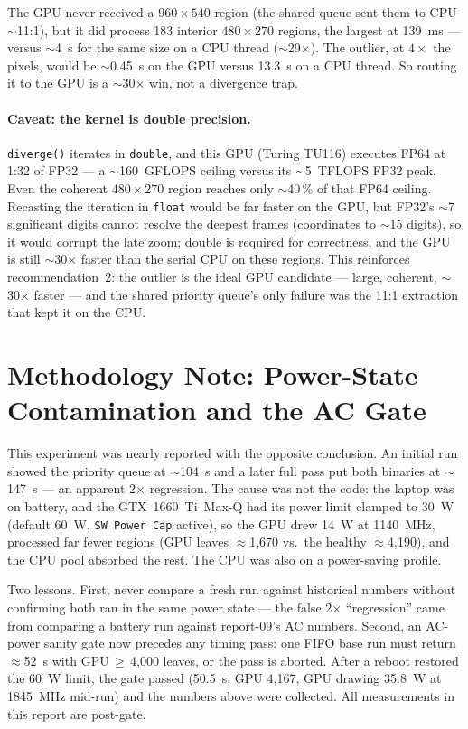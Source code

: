 \documentclass[
	english,
	letterpaper, oneside
]{article}
\begin{document}
The GPU never received a $960\times540$ region (the shared queue sent them to CPU
$\sim$11:1), but it did process 183 interior $480\times270$ regions, the largest
at 139~ms --- versus $\sim$4~s for the same size on a CPU thread ($\sim$29$\times$).
The outlier, at $4\times$ the pixels, would be $\sim$0.45~s on the GPU versus
13.3~s on a CPU thread. So routing it to the GPU is a $\sim$30$\times$ win, not a
divergence trap.

\paragraph{Caveat: the kernel is double precision.} \texttt{diverge()} iterates
in \texttt{double}, and this GPU (Turing TU116) executes FP64 at 1:32 of FP32 ---
a $\sim$160~GFLOPS ceiling versus its $\sim$5~TFLOPS FP32 peak. Even the coherent
$480\times270$ region reaches only $\sim$40\,\% of that FP64 ceiling. Recasting the
iteration in \texttt{float} would be far faster on the GPU, but FP32's $\sim$7
significant digits cannot resolve the deepest frames (coordinates to $\sim$15
digits), so it would corrupt the late zoom; double is required for correctness,
and the GPU is still $\sim$30$\times$ faster than the serial CPU on these regions.
This reinforces recommendation~2: the outlier is the ideal GPU candidate ---
large, coherent, $\sim$30$\times$ faster --- and the shared priority queue's only
failure was the 11:1 extraction that kept it on the CPU.

\section{Methodology Note: Power-State Contamination and the AC Gate}

This experiment was nearly reported with the opposite conclusion. An initial run
showed the priority queue at $\sim$104~s and a later full pass put both
binaries at $\sim$147~s --- an apparent 2$\times$ regression. The cause was not
the code: the laptop was on battery, and the GTX~1660~Ti~Max-Q had its
power limit clamped to 30~W (default 60~W, \texttt{SW Power Cap}
active), so the GPU drew 14~W at 1140~MHz, processed far fewer regions
(GPU leaves $\approx$1{,}670 vs.\ the healthy $\approx$4{,}190), and the CPU pool
absorbed the rest. The CPU was also on a power-saving profile.

Two lessons. First, never compare a fresh run against historical
numbers without confirming both ran in the same power state --- the false
2$\times$ ``regression'' came from comparing a battery run against report-09's
AC numbers. Second, an AC-power sanity gate now precedes any timing
pass: one FIFO base run must return $\approx$52~s with GPU\,$\ge$\,4{,}000 leaves,
or the pass is aborted. After a reboot restored the 60~W limit, the gate passed
(50.5~s, GPU 4{,}167, GPU drawing 35.8~W at 1845~MHz mid-run) and the numbers
above were collected. All measurements in this report are post-gate.
\end{document}
